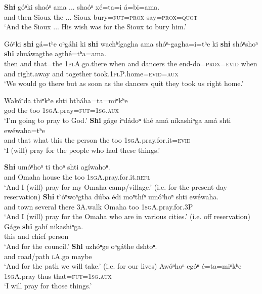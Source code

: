 \documentclass[output=paper]{LSP/langsci}
\begin{document}
\ex\label{ex:rudin:9} 
\gll  \textbf{Shi}  góⁿki 	shaóⁿ 	ama ... shaóⁿ  	xé=ta=i  á=bi=ama.\\          
    	and  	then 	Sioux 	the 	 ... Sioux  	bury=\textsc{fut=prox} 	say=\textsc{prox=quot}\\
\trans `And the Sioux ...  His wish was for the Sioux to bury him.'

\ex\label{ex:rudin:10} 
\gll  Góⁿki 	\textbf{shi} 	gá=tʰe  oⁿgáhi  ki    \textbf{shi} 	wachʰígagha ama  shóⁿ-gagha=i=tʰe 	ki 	\textbf{shi} 	shóⁿshoⁿ    \textbf{shi} 	zhuáwagthe 	agthé=tʰa=ama.\\
    	then 	and that=the \textsc{1plA}.go.there when 	and dancers the end-do=\textsc{prox=evid} when 	and right.away and 	together 	took.\textsc{1plP}.home=\textsc{evid=aux}\\
\trans `We would go there but as soon as the dancers quit they took us right home.'
\z 

\ea                 \label{ex:rudin:11}
\ea
\gll  Wakóⁿda 	thiⁿkʰe 	shti  	btháha=ta=miⁿkʰe\\
	god          	the       	too  	\textsc{1sgA}.pray=\textsc{fut=1sg.aux}\\
\trans `I'm going to pray to God.'
\ex 
\gll	\textbf{Shi} gáge 	iⁿdádoⁿ thé 	amá 	níkashiⁿga 	amá 	shti ewéwaha=tʰe\\
and 	that   what     	this 	the 	person    	the 	too 	\textsc{1sgA}.pray.for.it=\textsc{evid}\\
\trans `I (will) pray for the people who had these things.'

\ex 
\gll	\textbf{Shi}  umóⁿhoⁿ 	ti    	thoⁿ 	shti 	agíwahoⁿ.\\
and 	Omaha  	house 	the 	too 	\textsc{1sgA}.pray.for.it.\textsc{refl}\\
\trans `And I (will) pray for my Omaha camp/village.'  (i.e. for the present-day reservation)
\ex 
\gll	\textbf{Shi} tʰóⁿwoⁿgtha dúba  édi moⁿthíⁿ umóⁿhoⁿ shti ewéwaha. \\         
and town several there 3A.walk Omaha  	too 	\textsc{1sgA}.pray.for.3P\\
\trans `And I (will) pray for the Omaha who are in various cities.'  (i.e. off reservation)
\ex 
\gll	Gáge \textbf{shi} 	gahí 	nikashiⁿga.\\
	this 	and 	chief  	person\\
\trans `And for the council.'
\ex 
\gll	\textbf{Shi} uzhóⁿge  	oⁿgáthe 	dshtoⁿ.\\
	and  	road/path 	\textsc{lA}.go  	maybe\\
\trans `And for the path we will take.'  (i.e. for our lives)
\ex 
\gll	Awóⁿhoⁿ 	egóⁿ  	é=ta=miⁿkʰe\\
	\textsc{1sgA}.pray 	thus 	that=\textsc{fut=1sg.aux}\\
\trans `I will pray for those things.' 
\z
\z
\end{document}
